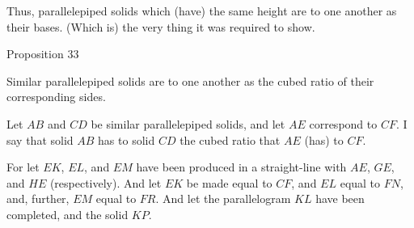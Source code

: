 Thus, parallelepiped solids which (have) the same height
are to one another as their bases. (Which is) the very thing it was required to
show.



\begin{center}
{\large Proposition 33}
\end{center}

Similar parallelepiped solids are to one another
as the cubed ratio of their corresponding sides.

Let $AB$ and $CD$ be similar parallelepiped solids, and let $AE$
correspond to $CF$. I say that solid $AB$ has to solid $CD$ the
cubed ratio that $AE$ (has) to $CF$.

For let $EK$, $EL$, and $EM$ have been produced in a straight-line
with $AE$, $GE$, and $HE$ (respectively). And let
$EK$ be made equal to $CF$, and $EL$ equal to $FN$, and, further,
$EM$ equal to $FR$. And let the parallelogram $KL$ have been
completed, and the solid $KP$.\\

\epsfysize=1.9in
\centerline{}

